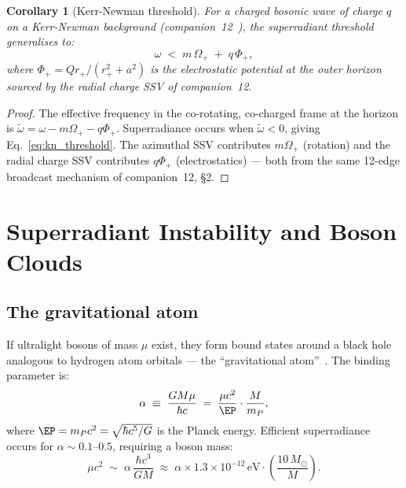 \documentclass[12pt]{article}
\newtheorem{corollary}[theorem]{Corollary}
\newcommand{\mP}{m_P}
\newcommand{\Oplus}{\Omega_+}
\newcommand{\Phiplus}{\Phi_+}
\begin{document}
\begin{corollary}[Kerr-Newman threshold]
\label{cor:kn}
For a charged bosonic wave of charge $q$ on a Kerr-Newman background
(companion~12~\cite{c12}), the superradiant threshold generalises to:
\begin{equation}
  \omega \;<\; m\,\Oplus \;+\; q\,\Phiplus,
  \label{eq:kn_threshold}
\end{equation}
where $\Phiplus = Qr_+/(r_+^2 + a^2)$ is the electrostatic potential
at the outer horizon sourced by the radial charge SSV of companion~12.
\end{corollary}

\begin{proof}
The effective frequency in the co-rotating, co-charged frame at the
horizon is $\tilde\omega = \omega - m\Oplus - q\Phiplus$.  Superradiance
occurs when $\tilde\omega < 0$, giving Eq.~\eqref{eq:kn_threshold}.
The azimuthal SSV contributes $m\Oplus$ (rotation) and the radial
charge SSV contributes $q\Phiplus$ (electrostatics) — both from the
same 12-edge broadcast mechanism of companion~12, §2.
\end{proof}

\section{Superradiant Instability and Boson Clouds}
\label{sec:boson_cloud}

\subsection{The gravitational atom}

If ultralight bosons of mass $\mu$ exist, they form bound states around
a black hole analogous to hydrogen atom orbitals — the ``gravitational
atom''~\cite{detweiler1980}.  The binding parameter is:
\begin{equation}
  \alpha \;\equiv\; \frac{GM\mu}{\hbar c} \;=\; \frac{\mu c^2}{\EP}\cdot\frac{M}{\mP},
  \label{eq:alpha}
\end{equation}
where $\EP = \mP c^2 = \sqrt{\hbar c^5/G}$ is the Planck energy.
Efficient superradiance occurs for $\alpha \sim 0.1$--$0.5$, requiring
a boson mass:
\begin{equation}
  \mu c^2 \;\sim\; \alpha\,\frac{\hbar c^3}{GM}
  \;\approx\; \alpha\times 1.3\times10^{-12}\,\mathrm{eV}
  \cdot\left(\frac{10\,M_\odot}{M}\right).
  \label{eq:mu_optimal}
\end{equation}
\end{document}
